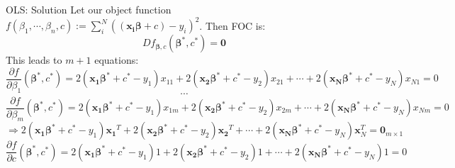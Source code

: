 \documentclass[final]{beamer}
\newcommand{\bd}{\mathbf}
\newcommand{\p}{\partial}
\begin{document}
\begin{frame}[t]{OLS: Solution}
	Let our object function $f(\beta_1,\cdots,\beta_n,c):=\sum_i^N ( (\bd{x_i}\bd{\beta}+{c})-y_i)^2$. Then FOC is:
	\[
		Df_{\bd{\beta},c}(\bd{\beta}^\ast,c^\ast)=\bd{0} \tag{FOC}
	\]
	This leads to $m+1$ equations:\[
		\frac{\p f}{\p \beta_1}(\bd{\beta^\ast},c^\ast) = 2(\bd{x_1}\bd{\beta^\ast}+c^\ast-y_1)x_{11}+2(\bd{x_2}\bd{\beta^\ast}+c^\ast-y_2)x_{21}+\cdots+2(\bd{x_N}\bd{\beta^\ast}+c^\ast-y_N)x_{N1} = 0
	\]\[
		\cdots
	\]\[
		\frac{\p f}{\p \beta_m}(\bd{\beta^\ast},c^\ast) = 2(\bd{x_1}\bd{\beta^\ast}+c^\ast-y_1)x_{1m}+2(\bd{x_2}\bd{\beta^\ast}+c^\ast-y_2)x_{2m}+\cdots+2(\bd{x_N}\bd{\beta^\ast}+c^\ast-y_N)x_{Nm} = 0
	\]
	\[
			\Rightarrow 2(\bd{x_1}\bd{\beta^\ast}+c^\ast-y_1)\bd{x_1}^T+2(\bd{x_2}\bd{\beta^\ast}+c^\ast-y_2)\bd{x_2}^T+\cdots+2(\bd{x_N}\bd{\beta^\ast}+c^\ast-y_N)\bd{x}_{N}^T = \bd{0}_{m\times 1}
		\tag{B}\]
	\[
		\frac{\p f}{\p c}(\bd{\beta^\ast},c^\ast) = 2(\bd{x_1}\bd{\beta^\ast}+c^\ast-y_1)1+2(\bd{x_2}\bd{\beta^\ast}+c^\ast-y_2)1+\cdots+2(\bd{x_N}\bd{\beta^\ast}+c^\ast-y_N)1 = 0 \tag{C}
	\]
\end{frame}
\end{document}
